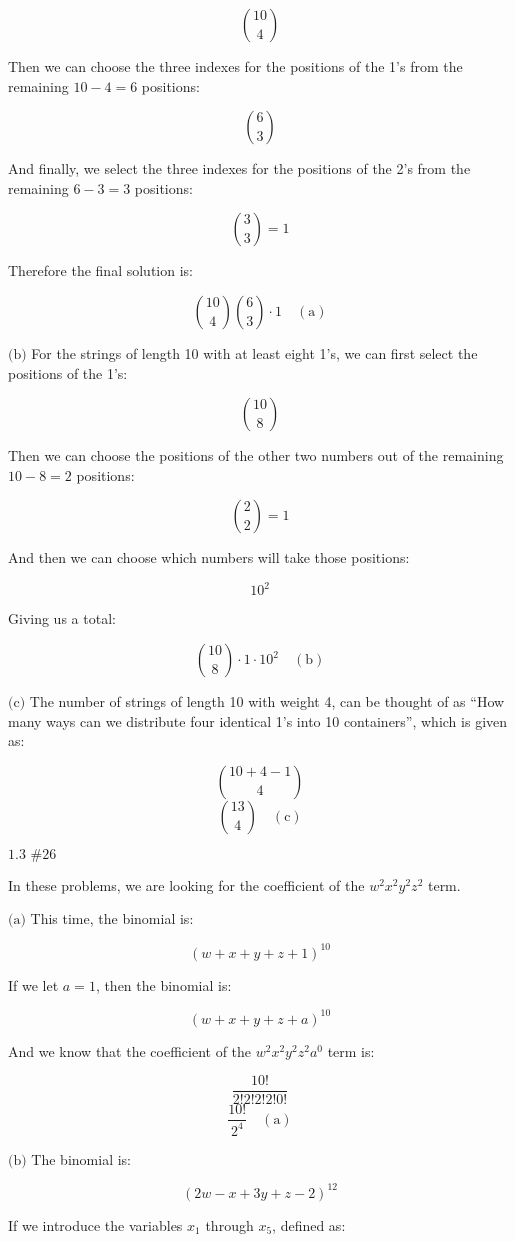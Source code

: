\documentclass{article}
\newcommand{\problem}[2]{$\boxed{\text{#1 \##2}}$}
\newcommand{\subproblem}[1]{$\boxed{\text{(#1)}}$}
\newcommand{\subsolution}[2]{\boxed{#2\quad(\text{#1})}}
\begin{document}
\begin{multicols*}{2}
\[
\binom{10}{4}
\]

Then we can choose the three indexes for the positions of the 1's from
the remaining $10-4=6$ positions:

\[
\binom{6}{3}
\]

And finally, we select the three indexes for the positions of the 2's
from the remaining $6-3=3$ positions:

\[
\binom{3}{3}=1
\]

Therefore the final solution is:

\[
\subsolution{a}{\binom{10}{4}\binom{6}{3}\cdot1}
\]

%
\subproblem{b} For the strings of length 10 with at least eight 1's,
we can first select the positions of the 1's:

\[
\binom{10}{8}
\]

Then we can choose the positions of the other two numbers out of the
remaining $10-8=2$ positions:

\[
\binom{2}{2}=1
\]

And then we can choose which numbers will take those positions:

\[
10^2
\]

Giving us a total:

\[
\subsolution{b}{\binom{10}{8}\cdot1\cdot10^2}
\]

%
\subproblem{c} The number of strings of length 10 with weight 4, can
be thought of as ``How many ways can we distribute four identical 1's
into 10 containers'', which is given as:

\[
\binom{10+4-1}{4}
\] \[
\subsolution{c}{\binom{13}{4}}
\]

%
\problem{1.3}{26}

In these problems, we are looking for the coefficient of the
$w^2x^2y^2z^2$ term.

%
\subproblem{a} This time, the binomial is:

\[
(w+x+y+z+1)^{10}
\]

If we let $a=1$, then the binomial is:

\[
(w+x+y+z+a)^{10}
\]

And we know that the coefficient of the $w^2x^2y^2z^2a^0$ term is:

\[
\frac{10!}{2!2!2!2!0!}
\] \[
\subsolution{a}{\frac{10!}{2^4}}
\]

%
\subproblem{b} The binomial is:

\[
(2w-x+3y+z-2)^{12}
\]

If we introduce the variables $x_1$ through $x_5$, defined as:


\end{multicols*}
\end{document}

